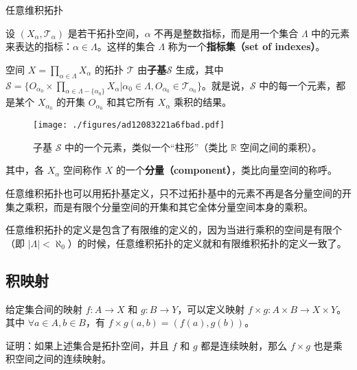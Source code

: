 \begin{definition}{任意维积拓扑}

设 $(X_\alpha, \mathcal{T}_\alpha)$ 是若干拓扑空间，$\alpha$ 不再是整数指标，而是用一个集合 $\Lambda$ 中的元素来表达的指标：$\alpha\in\Lambda$。这样的集合 $\Lambda$ 称为一个\textbf{指标集（set of indexes）}。

空间 $X=\prod\limits_{\alpha\in\Lambda}X_\alpha$ 的拓扑 $\mathcal{T}$ 由\textbf{子基}$\mathcal{S}$ 生成，其中 $\mathcal{S}=\{O_{\alpha_0}\times\prod\limits_{\alpha\in\Lambda-\{\alpha_0\}}X_\alpha|\alpha_0\in\Lambda, O_{\alpha_0}\in\mathcal{T}_{\alpha_0}\}$。就是说，$\mathcal{S}$ 中的每一个元素，都是某个 $X_{\alpha_0}$ 的开集 $O_{\alpha_0}$ 和其它所有 $X_\alpha$ 乘积的结果。

\begin{figure}[ht]
\centering
\texttt{[image: ./figures/ad12083221a6fbad.pdf]}
\caption{子基 $\mathcal{S}$ 中的一个元素，类似一个“柱形”（类比 $\mathbb{R}$ 空间之间的乘积）。} \label{fig_Topo6_1}
\end{figure}

其中，各 $X_\alpha$ 空间称作 $X$ 的一个\textbf{分量（component）}，类比向量空间的称呼。

\end{definition}

任意维积拓扑也可以用拓扑基定义，只不过拓扑基中的元素不再是各分量空间的开集之乘积，而是有限个分量空间的开集和其它全体分量空间本身的乘积。

任意维积拓扑的定义是包含了有限维的定义的，因为当进行乘积的空间是有限个（即 $|\Lambda|<\aleph_0$）的时候，任意维积拓扑的定义就和有限维积拓扑的定义一致了。

\subsection{积映射}

给定集合间的映射 $f:A\rightarrow X$ 和 $g:B\rightarrow Y$，可以定义映射 $f\times g:A\times B\rightarrow X\times Y$。其中 $\forall a\in A, b\in B$，有 $f\times g(a, b)=(f(a), g(b))$。

\begin{exercise}{}\label{exe_Topo6_1}
证明：如果上述集合是拓扑空间，并且 $f$ 和 $g$ 都是连续映射，那么 $f\times g$ 也是乘积空间之间的连续映射。
\end{exercise}



